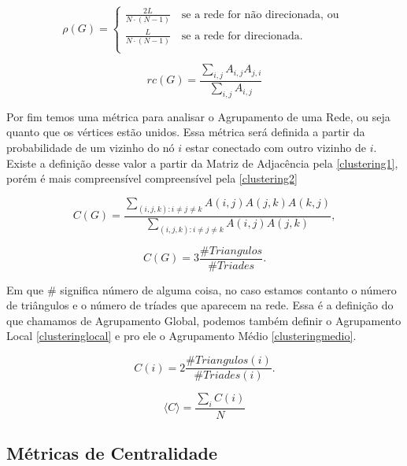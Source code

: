 \[   
  \rho(G) = 
     \begin{cases}
      \frac{2L}{N\cdot(N-1)} \quad \text{se a rede for não direcionada, ou }\\
      \frac{L}{N\cdot(N-1)} \quad \text{se a rede for direcionada.} \\
     \end{cases}
\]

\begin{equation}
  rc(G) = \frac{\sum_{i,j} A_{i,j}A_{j,i}}{\sum_{i,j} A_{i,j}}
\end{equation}

Por fim temos uma métrica para analisar o Agrupamento de uma Rede, ou seja quanto que os vértices estão unidos. Essa métrica será definida a partir da probabilidade de um vizinho do nó $i$ estar conectado com outro vizinho de $i$. Existe a definição desse valor a partir da Matriz de Adjacência pela \ref{clustering1}, porém é mais compreensível compreensível pela \ref{clustering2}

\begin{equation}
  C(G) = \frac{\sum_{(i,j,k): i\neq j \neq k}A(i,j)A(j,k)A(k,j)}{\sum_{(i,j,k): i\neq j \neq k}A(i,j)A(j,k)},
  \label{clustering1}
\end{equation}

\begin{equation}
  C(G) = 3\frac{\#Triangulos}{\#Triades}.
  \label{clustering2}
\end{equation}

Em que $\#$ significa número de alguma coisa, no caso estamos contanto o número de triângulos e o número de tríades que aparecem na rede. Essa é a definição do que chamamos de Agrupamento Global, podemos também definir o Agrupamento Local \ref{clusteringlocal} e pro ele o Agrupamento Médio \ref{clusteringmedio}. 

\begin{equation}
  C(i) = 2\frac{\#Triangulos(i)}{\#Triades(i)}.
  \label{clusteringlocal}
\end{equation}

\begin{equation}
  \langle C \rangle = \frac{\sum\limits_{i} C(i)}{N}
  \label{clusteringmedio}
\end{equation}

\subsection{Métricas de Centralidade}


